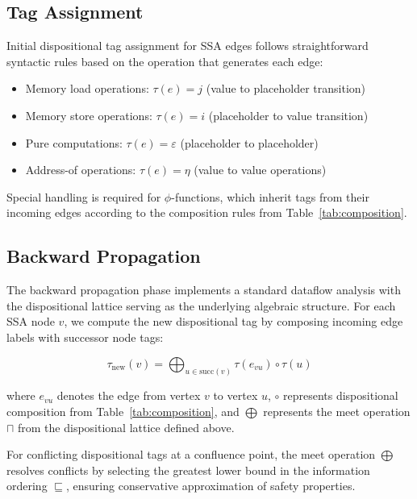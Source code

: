 \documentclass[journal]{IEEEtran}
\begin{document}
\subsection{Tag Assignment}

Initial dispositional tag assignment for SSA edges follows straightforward syntactic rules based on the operation that generates each edge:

\begin{itemize}
\item Memory load operations: $\tau(e) = j$ (value to placeholder transition)
\item Memory store operations: $\tau(e) = i$ (placeholder to value transition)
\item Pure computations: $\tau(e) = \varepsilon$ (placeholder to placeholder)
\item Address-of operations: $\tau(e) = \eta$ (value to value operations)
\end{itemize}

Special handling is required for $\phi$-functions, which inherit tags from their incoming edges according to the composition rules from Table~\ref{tab:composition}.

\subsection{Backward Propagation}

The backward propagation phase implements a standard dataflow analysis with the dispositional lattice serving as the underlying algebraic structure. For each SSA node $v$, we compute the new dispositional tag by composing incoming edge labels with successor node tags:

\begin{equation}
\tau_{\text{new}}(v) = \bigoplus_{u \in \text{succ}(v)} \tau(e_{vu}) \circ \tau(u)
\end{equation}

where $e_{vu}$ denotes the edge from vertex $v$ to vertex $u$, $\circ$ represents dispositional composition from Table~\ref{tab:composition}, and $\bigoplus$ represents the meet operation $\sqcap$ from the dispositional lattice defined above.

\begin{definition}
For conflicting dispositional tags at a confluence point, the meet operation $\bigoplus$ resolves conflicts by selecting the greatest lower bound in the information ordering $\sqsubseteq$, ensuring conservative approximation of safety properties.
\end{definition}
\end{document}
